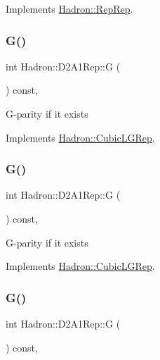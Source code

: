 Implements \mbox{\hyperlink{structHadron_1_1RepRep_a92c8802e5ed7afd7da43ccfd5b7cd92b}{Hadron\+::\+Rep\+Rep}}.

\mbox{\label{structHadron_1_1D2A1Rep_a6554f360e6246dce7c2d91b786a87519}} 
\subsubsection{\texorpdfstring{G()}{G()}\hspace{0.1cm}{\footnotesize\ttfamily [1/3]}}
{\footnotesize\ttfamily int Hadron\+::\+D2\+A1\+Rep\+::G (\begin{DoxyParamCaption}{ }\end{DoxyParamCaption}) const\hspace{0.3cm}{\ttfamily [inline]}, {\ttfamily [virtual]}}

G-\/parity if it exists 

Implements \mbox{\hyperlink{structHadron_1_1CubicLGRep_ace26f7b2d55e3a668a14cb9026da5231}{Hadron\+::\+Cubic\+L\+G\+Rep}}.

\mbox{\label{structHadron_1_1D2A1Rep_a6554f360e6246dce7c2d91b786a87519}} 
\subsubsection{\texorpdfstring{G()}{G()}\hspace{0.1cm}{\footnotesize\ttfamily [2/3]}}
{\footnotesize\ttfamily int Hadron\+::\+D2\+A1\+Rep\+::G (\begin{DoxyParamCaption}{ }\end{DoxyParamCaption}) const\hspace{0.3cm}{\ttfamily [inline]}, {\ttfamily [virtual]}}

G-\/parity if it exists 

Implements \mbox{\hyperlink{structHadron_1_1CubicLGRep_ace26f7b2d55e3a668a14cb9026da5231}{Hadron\+::\+Cubic\+L\+G\+Rep}}.

\mbox{\label{structHadron_1_1D2A1Rep_a6554f360e6246dce7c2d91b786a87519}} 
\subsubsection{\texorpdfstring{G()}{G()}\hspace{0.1cm}{\footnotesize\ttfamily [3/3]}}
{\footnotesize\ttfamily int Hadron\+::\+D2\+A1\+Rep\+::G (\begin{DoxyParamCaption}{ }\end{DoxyParamCaption}) const\hspace{0.3cm}{\ttfamily [inline]}, {\ttfamily [virtual]}}

